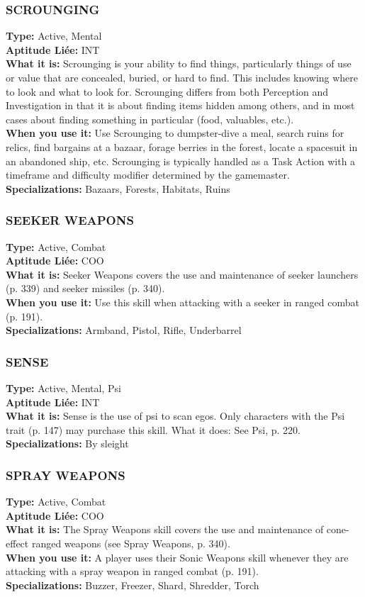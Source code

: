 \subsubsection{SCROUNGING} \textbf{Type:} Active, Mental \\ \textbf{Aptitude Liée:} INT \\ \textbf{What it is:} Scrounging is your ability to find things, particularly things of use or value that are concealed, buried, or hard to find. This includes knowing where to look and what to look for. Scrounging differs from both Perception and Investigation in that it is about finding items hidden among others, and in most cases about finding something in particular (food, valuables, etc.). \\ \textbf{When you use it:} Use Scrounging to dumpster-dive a meal, search ruins for relics, find bargains at a bazaar, forage berries in the forest, locate a spacesuit in an abandoned ship, etc. Scrounging is typically handled as a Task Action with a timeframe and difficulty modifier determined by the gamemaster. \\ \textbf{Specializations:} Bazaars, Forests, Habitats, Ruins 

\subsubsection{SEEKER WEAPONS} \textbf{Type:} Active, Combat \\ \textbf{Aptitude Liée:} COO \\ \textbf{What it is:} Seeker Weapons covers the use and maintenance of seeker launchers (p. 339) and seeker missiles (p. 340). \\ \textbf{When you use it:} Use this skill when attacking with a seeker in ranged combat (p. 191). \\ \textbf{Specializations:} Armband, Pistol, Rifle, Underbarrel 

\subsubsection{SENSE} \textbf{Type:} Active, Mental, Psi \\ \textbf{Aptitude Liée:} INT \\ \textbf{What it is:} Sense is the use of psi to scan egos. Only characters with the Psi trait (p. 147) may purchase this skill. What it does: See Psi, p. 220. \\ \textbf{Specializations:} By sleight 

\subsubsection{SPRAY WEAPONS} \textbf{Type:} Active, Combat \\ \textbf{Aptitude Liée:} COO \\ \textbf{What it is:} The Spray Weapons skill covers the use and maintenance of cone-effect ranged weapons (see Spray Weapons, p. 340). \\ \textbf{When you use it:} A player uses their Sonic Weapons skill whenever they are attacking with a spray weapon in ranged combat (p. 191). \\ \textbf{Specializations:} Buzzer, Freezer, Shard, Shredder, Torch 

